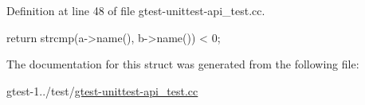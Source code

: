 \-Definition at line 48 of file gtest-\/unittest-\/api\-\_\-test.\-cc.


\begin{DoxyCode}
                                          {
    return strcmp(a->name(), b->name()) < 0;
  }
\end{DoxyCode}


\-The documentation for this struct was generated from the following file\-:\begin{DoxyCompactItemize}
\item 
gtest-\/1../test/\hyperlink{gtest-unittest-api__test_8cc}{gtest-\/unittest-\/api\-\_\-test.\-cc}\end{DoxyCompactItemize}
